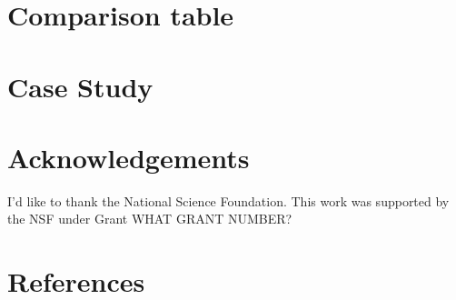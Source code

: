 \documentclass[article]{jss}
\begin{document}
\section{Comparison table}




\section{Case Study}

\section*{Acknowledgements}
I'd like to thank the National Science Foundation. This work was supported by the NSF under Grant WHAT GRANT NUMBER? 

\section*{References}
\end{document}
